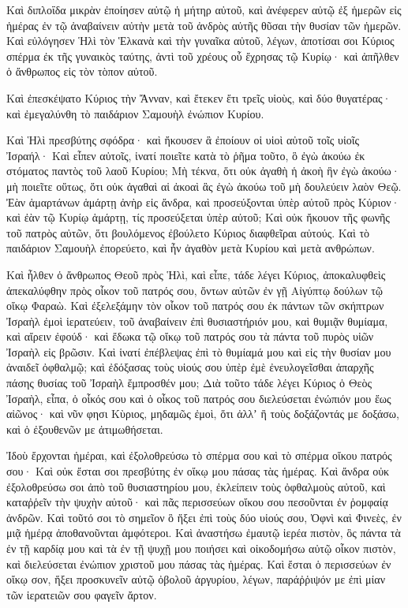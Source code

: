 {Καὶ διπλοΐδα μικρὰν ἐποίησεν αὐτῷ ἡ μήτηρ αὐτοῦ, καὶ ἀνέφερεν αὐτῷ ἐξ ἡμερῶν εἰς ἡμέρας ἐν τῷ ἀναβαίνειν αὐτὴν μετὰ τοῦ ἀνδρὸς αὐτῆς θῦσαι τὴν θυσίαν τῶν ἡμερῶν.
Καὶ εὐλόγησεν Ἡλὶ τὸν Ἑλκανὰ καὶ τὴν γυναῖκα αὐτοῦ, λέγων, ἀποτίσαι σοι Κύριος σπέρμα ἐκ τῆς γυναικὸς ταύτης, ἀντὶ τοῦ χρέους οὗ ἔχρησας τῷ Κυρίῳ· καὶ ἀπῆλθεν ὁ ἄνθρωπος εἰς τὸν τὸπον αὐτοῦ.
\par }{\PP {}Καὶ ἐπεσκέψατο Κύριος τὴν Ἄνναν, καὶ ἔτεκεν ἔτι τρεῖς υἱοὺς, καὶ δύο θυγατέρας· καὶ ἐμεγαλύνθη τὸ παιδάριον Σαμουὴλ ἐνώπιον Κυρίου.
\par }{\PP {}Καὶ Ἡλὶ πρεσβύτης σφόδρα· καὶ ἤκουσεν ἃ ἐποίουν οἱ υἱοὶ αὐτοῦ τοῖς υἱοῖς Ἰσραήλ·
Καὶ εἶπεν αὐτοῖς, ἱνατί ποιεῖτε κατὰ τὸ ῥῆμα τοῦτο, ὃ ἐγὼ ἀκούω ἐκ στόματος παντὸς τοῦ λαοῦ Κυρίου;
Μὴ τέκνα, ὅτι οὐκ ἀγαθὴ ἡ ἀκοὴ ἣν ἐγὼ ἀκούω· μὴ ποιεῖτε οὕτως, ὅτι οὐκ ἀγαθαὶ αἱ ἀκοαὶ ἃς ἐγὼ ἀκούω τοῦ μὴ δουλεύειν λαὸν Θεῷ.
Ἐὰν ἁμαρτάνων ἁμάρτῃ ἀνὴρ εἰς ἄνδρα, καὶ προσεύξονται ὑπὲρ αὐτοῦ πρὸς Κύριον· καὶ ἐὰν τῷ Κυρίῳ ἁμάρτῃ, τίς προσεύξεται ὑπὲρ αὐτοῦ; Καὶ οὐκ ἤκουον τῆς φωνῆς τοῦ πατρὸς αὐτῶν, ὅτι βουλόμενος ἐβούλετο Κύριος διαφθεῖραι αὐτούς.
Καὶ τὸ παιδάριον Σαμουὴλ ἐπορεύετο, καὶ ἦν ἀγαθὸν μετὰ Κυρίου καὶ μετὰ ανθρώπων.
\par }{\PP {}Καὶ ἦλθεν ὁ ἄνθρωπος Θεοῦ πρὸς Ἡλὶ, καὶ εἶπε, τάδε λέγει Κύριος, ἀποκαλυφθεὶς ἀπεκαλύφθην πρὸς οἶκον τοῦ πατρός σου, ὄντων αὐτῶν ἐν γῇ Αἰγύπτῳ δούλων τῷ οἴκῳ Φαραὼ.
Καὶ ἐξελεξάμην τὸν οἶκον τοῦ πατρός σου ἐκ πάντων τῶν σκήπτρων Ἰσραὴλ ἐμοὶ ἱερατεύειν, τοῦ ἀναβαίνειν ἐπὶ θυσιαστήριόν μου, καὶ θυμιᾷν θυμίαμα, καὶ αἴρειν ἐφούδ· καὶ ἔδωκα τῷ οἴκῳ τοῦ πατρός σου τὰ πάντα τοῦ πυρὸς υἱῶν Ἰσραὴλ εἰς βρῶσιν.
Καὶ ἱνατί ἐπέβλεψας ἐπὶ τὸ θυμίαμά μου καὶ εἰς τὴν θυσίαν μου ἀναιδεῖ ὀφθαλμῷ; καὶ ἐδόξασας τοὺς υἱούς σου ὑπὲρ ἐμὲ ἐνευλογεῖσθαι ἀπαρχῆς πάσης θυσίας τοῦ Ἰσραὴλ ἔμπροσθέν μου;
Διὰ τοῦτο τάδε λέγει Κύριος ὁ Θεὸς Ἰσραὴλ, εἶπα, ὁ οἶκός σου καὶ ὁ οἶκος τοῦ πατρός σου διελεύσεται ἐνώπιόν μου ἕως αἰῶνος· καὶ νῦν φησι Κὺριος, μηδαμῶς ἐμοὶ, ὅτι ἀλλʼ ἢ τοὺς δοξάζοντάς με δοξάσω, καὶ ὁ ἐξουθενῶν με ἀτιμωθήσεται.
\par }{\PP {}Ἰδοὺ ἔρχονται ἡμέραι, καὶ ἐξολοθρεύσω τὸ σπέρμα σου καὶ τὸ σπέρμα οἴκου πατρός σου·
Καὶ οὐκ ἔσται σοι πρεσβύτης ἐν οἴκῳ μου πάσας τὰς ἡμέρας.
Καὶ ἄνδρα οὐκ ἐξολοθρεύσω σοι ἀπὸ τοῦ θυσιαστηρίου μου, ἐκλείπειν τοὺς ὀφθαλμοὺς αὐτοῦ, καὶ καταῤῥεῖν τὴν ψυχὴν αὐτοῦ· καὶ πᾶς περισσεύων οἴκου σου πεσοῦνται ἐν ῥομφαίᾳ ἀνδρῶν.
Καὶ τοῦτό σοι τὸ σημεῖον ὃ ἥξει ἐπὶ τοὺς δύο υἱούς σου, Ὀφνὶ καὶ Φινεὲς, ἐν μιᾷ ἡμέρᾳ ἀποθανοῦνται ἀμφότεροι.
Καὶ ἀναστήσω ἐμαυτῷ ἱερέα πιστὸν, ὃς πάντα τὰ ἐν τῇ καρδίᾳ μου καὶ τὰ ἐν τῇ ψυχῇ μου ποιήσει καὶ οἰκοδομήσω αὐτῷ οἶκον πιστὸν, καὶ διελεύσεται ἐνώπιον χριστοῦ μου πάσας τὰς ἡμέρας.
Καὶ ἔσται ὁ περισσεύων ἐν οἴκῳ σον, ἥξει προσκυνεῖν αὐτῷ ὀβολοῦ ἀργυρίου, λέγων, παράῤῥιψόν με ἐπὶ μίαν τῶν ἱερατειῶν σου φαγεῖν ἄρτον.

}
